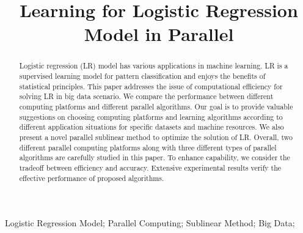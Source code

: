 \documentclass[10pt, conference, compsocconf]{IEEEtran}
\begin{document}
\title{Learning for Logistic Regression Model in Parallel}

\author{
\and
{}
\and
{}
\and
{}
}

\maketitle

\begin{abstract}
Logistic regression (LR) model has various applications in machine learning.
LR is a supervised learning model for pattern classification and enjoys the benefits of statistical principles.
This paper addresses the issue of computational efficiency for solving LR in big data scenario.
We compare the performance between different computing platforms and different parallel algorithms.
Our goal is to provide valuable suggestions on choosing computing platforms and learning algorithms according to different application situations for specific datasets and machine resources.
We also present a novel parallel sublinear method to optimize the solution of LR.
Overall, two different parallel computing platforms along with three different types of parallel algorithms are carefully studied in this paper.
To enhance capability, we consider the tradeoff between efficiency and accuracy.
Extensive experimental results verify the effective performance of proposed algorithms.
\end{abstract}

\begin{IEEEkeywords}
Logistic Regression Model; Parallel Computing; Sublinear Method; Big Data;
\end{IEEEkeywords}
\end{document}
